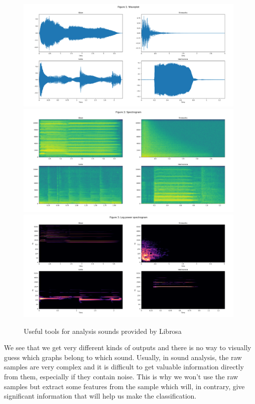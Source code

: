 \documentclass{article} %
\begin{document}
		\begin{figure}
		  \includegraphics[width=\linewidth]{waveplot.png}
		  \includegraphics[width=\linewidth]{spectrogram.png}
		  \includegraphics[width=\linewidth]{logspectrogram.png}
		  \caption{Useful tools for analysis sounds provided by Librosa}
		  \label{fig:graphs}
		\end{figure}

		We see that we get very different kinds of outputs and there is no way to visually guess which graphs belong to which sound.
		Usually, in sound analysis, the raw samples are very complex and it is difficult to get valuable information directly from them, especially if they contain noise.
		This is why we won't use the raw samples but extract some features from the sample which will, in contrary, give significant information that will help us make the classification.
\end{document}
